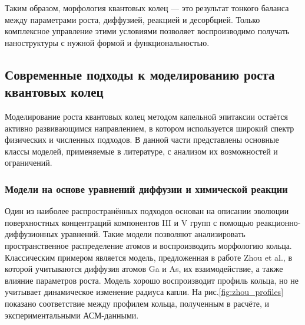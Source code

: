 \documentclass[14pt,oneside]{extarticle}
\begin{document}
Таким образом, морфология квантовых колец — это результат тонкого баланса между параметрами роста, диффузией, реакцией и десорбцией. Только комплексное управление этими условиями позволяет воспроизводимо получать наноструктуры с нужной формой и функциональностью.

\subsection{Современные подходы к моделированию роста квантовых колец}

Моделирование роста квантовых колец методом капельной эпитаксии остаётся активно развивающимся направлением, в котором используется широкий спектр физических и численных подходов. В данной части представлены основные классы моделей, применяемые в литературе, с анализом их возможностей и ограничений.

\subsubsection*{Модели на основе уравнений диффузии и химической реакции}
Один из наиболее распространённых подходов основан на описании эволюции поверхностных концентраций компонентов III и V групп с помощью реакционно-диффузионных уравнений. Такие модели позволяют анализировать пространственное распределение атомов и воспроизводить морфологию кольца. Классическим примером является модель, предложенная в работе Zhou et al.\cite{zhou2013}, в которой учитываются диффузия атомов Ga и As, их взаимодействие, а также влияние параметров роста. Модель хорошо воспроизводит профиль кольца, но не учитывает динамическое изменение радиуса капли. На рис.\ref{fig:zhou_profiles} показано соответствие между профилем кольца, полученным в расчёте, и экспериментальными АСМ-данными.
\end{document}
